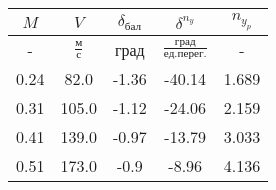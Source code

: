 \begin{tabular}{|c|c|c|c|c|}
\hline
$M$ & $V$ & $\delta_{бал}$ & $\delta^{n_y}$ & $n_{y_{p}}$ \\ 
\hline
- & $\frac{м}{с}$ & град & $\frac{град}{ед.перег.}$ & - \\ 
\hline
0.24 & 82.0 & -1.36 & -40.14 & 1.689 \\ 
\hline
0.31 & 105.0 & -1.12 & -24.06 & 2.159 \\ 
\hline
0.41 & 139.0 & -0.97 & -13.79 & 3.033 \\ 
\hline
0.51 & 173.0 & -0.9 & -8.96 & 4.136 \\ 
\hline
\end{tabular}